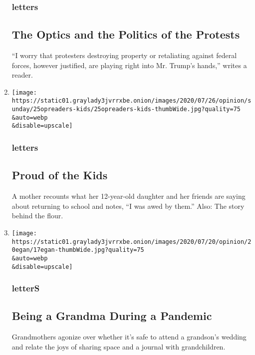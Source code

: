 \begin{enumerate}
  \hypertarget{letters-7}{%
  \subsubsection{letters}\label{letters-7}}

  \hypertarget{the-optics-and-the-politics-of-the-protests}{%
  \subsection{The Optics and the Politics of the
  Protests}\label{the-optics-and-the-politics-of-the-protests}}

  ``I worry that protesters destroying property or retaliating against
  federal forces, however justified, are playing right into Mr. Trump's
  hands,'' writes a reader.
\item
  \href{/2020/07/29/opinion/letters/children-pandemic.html}{}

  \texttt{[image: https://static01.graylady3jvrrxbe.onion/images/2020/07/26/opinion/sunday/25opreaders-kids/25opreaders-kids-thumbWide.jpg?quality=75\\\&auto=webp\\\&disable=upscale]}

  \hypertarget{letters-8}{%
  \subsubsection{letters}\label{letters-8}}

  \hypertarget{proud-of-the-kids}{%
  \subsection{Proud of the Kids}\label{proud-of-the-kids}}

  A mother recounts what her 12-year-old daughter and her friends are
  saying about returning to school and notes, ``I was awed by them.''
  Also: The story behind the flour.
\item
  \href{/2020/07/28/opinion/letters/pandemic-families.html}{}

  \texttt{[image: https://static01.graylady3jvrrxbe.onion/images/2020/07/20/opinion/20egan/17egan-thumbWide.jpg?quality=75\\\&auto=webp\\\&disable=upscale]}

  \hypertarget{letters-9}{%
  \subsubsection{letterS}\label{letters-9}}

  \hypertarget{being-a-grandma-during-a-pandemic}{%
  \subsection{Being a Grandma During a
  Pandemic}\label{being-a-grandma-during-a-pandemic}}

  Grandmothers agonize over whether it's safe to attend a grandson's
  wedding and relate the joys of sharing space and a journal with
  grandchildren.
\end{enumerate}

